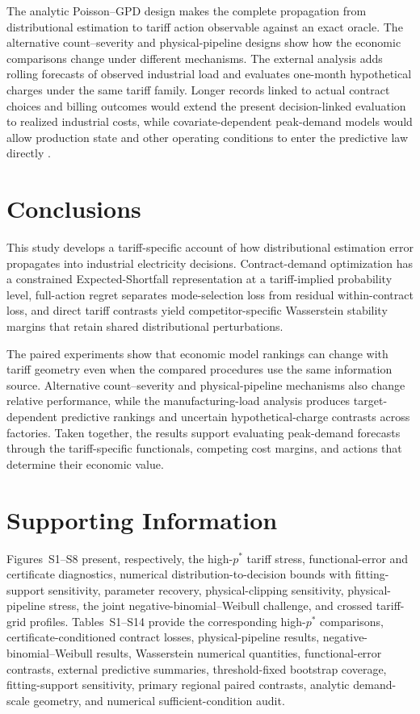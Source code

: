 \documentclass[Times1COL]{WileyNJDv5}
\begin{document}
The analytic Poisson--GPD design makes the complete propagation from
distributional estimation to tariff action observable against an exact
oracle. The alternative count--severity and physical-pipeline designs
show how the economic comparisons change under different mechanisms.
The external analysis adds rolling forecasts of observed industrial
load and evaluates one-month hypothetical charges under the same tariff
family. Longer records linked to actual contract choices and billing
outcomes would extend the present decision-linked evaluation to
realized industrial costs, while covariate-dependent peak-demand models
would allow production state and other operating conditions to enter
the predictive law directly \cite{YuTang2025}.

\section{Conclusions}
\label{sec:conclusions}

This study develops a tariff-specific account of how distributional
estimation error propagates into industrial electricity decisions.
Contract-demand optimization has a constrained Expected-Shortfall
representation at a tariff-implied probability level, full-action
regret separates mode-selection loss from residual within-contract
loss, and direct tariff contrasts yield competitor-specific
Wasserstein stability margins that retain shared distributional
perturbations.

The paired experiments show that economic model rankings can change
with tariff geometry even when the compared procedures use the same
information source. Alternative count--severity and physical-pipeline
mechanisms also change relative performance, while the
manufacturing-load analysis produces target-dependent predictive
rankings and uncertain hypothetical-charge contrasts across factories.
Taken together, the results support evaluating peak-demand forecasts
through the tariff-specific functionals, competing cost margins, and
actions that determine their economic value.

\section*{Supporting Information}
Figures~S1--S8 present, respectively, the high-$p^\ast$ tariff
stress, functional-error and certificate diagnostics, numerical
distribution-to-decision bounds with fitting-support sensitivity,
parameter recovery, physical-clipping sensitivity, physical-pipeline
stress, the joint negative-binomial--Weibull challenge, and crossed
tariff-grid profiles. Tables~S1--S14 provide the corresponding
high-$p^\ast$ comparisons, certificate-conditioned contract losses,
physical-pipeline results, negative-binomial--Weibull results,
Wasserstein numerical quantities, functional-error contrasts,
external predictive summaries, threshold-fixed bootstrap coverage,
fitting-support sensitivity, primary regional paired contrasts,
analytic demand-scale geometry, and numerical sufficient-condition
audit.
\end{document}
